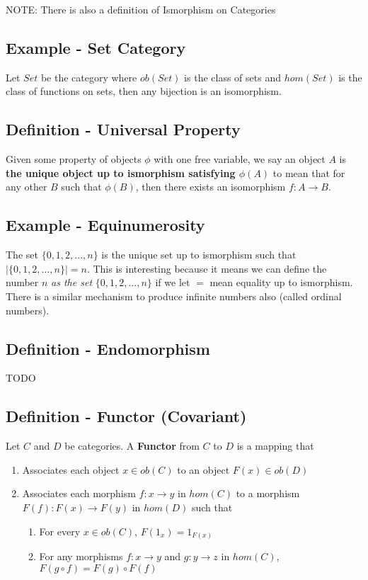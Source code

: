 \documentclass[9pt]{article} %
\begin{document}
NOTE: There is also a definition of Ismorphism on Categories

\subsection{Example - Set Category}

Let $Set$ be the category where $ob(Set)$ is the class of sets and $hom(Set)$ is the class of functions on sets, then any bijection is an isomorphism.

\subsection{Definition - Universal Property}

Given some property of objects $\phi$ with one free variable, we say an object $A$ is \textbf{the unique object up to ismorphism satisfying $\phi(A)$} to mean that for any other $B$ such that $\phi(B)$, then there exists an isomorphism $f: A \rightarrow B$.

\subsection{Example - Equinumerosity}

The set $\{ 0, 1, 2, ..., n \}$ is the unique set up to ismorphism such that $|\{ 0, 1, 2, ..., n \}| = n$. This is interesting because it means we can define the number $n$ \textit{as the set} $\{ 0, 1, 2, ..., n \}$ if we let $=$ mean equality up to ismorphism.  There is a similar mechanism to produce infinite numbers also (called ordinal numbers).

\subsection{Definition - Endomorphism}

TODO


\subsection{Definition - Functor (Covariant)}

Let $C$ and $D$ be categories. A \textbf{Functor} from $C$ to $D$ is a mapping that

\begin{enumerate}
    \item Associates each object $x \in ob(C)$ to an object $F(x) \in ob(D)$
    \item Associates each morphism $f: x \rightarrow y$ in $hom(C)$ to a morphism $F(f): F(x) \rightarrow F(y)$ in $hom(D)$ such that
    \begin{enumerate}
        \item For every $x \in ob(C)$, $F(1_x) = 1_{F(x)}$
        \item For any morphisms $f: x \rightarrow y$ and $g: y \rightarrow z$ in $hom(C)$, $F(g \circ f) = F(g) \circ F(f)$
    \end{enumerate}
\end{enumerate}
\end{document}
